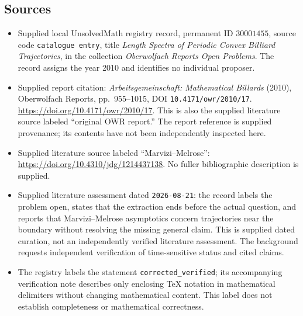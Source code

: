 \documentclass[11pt]{article}
\begin{document}
\subsection{Sources}
\begin{itemize}
\item Supplied local UnsolvedMath registry record, permanent ID \(30001455\), source code \texttt{catalogue entry}, title \emph{Length Spectra of Periodic Convex Billiard Trajectories}, in the collection \emph{Oberwolfach Reports Open Problems}. The record assigns the year 2010 and identifies no individual proposer.
\item Supplied report citation: \emph{Arbeitsgemeinschaft: Mathematical Billards} (2010), Oberwolfach Reports, pp.~955--1015, DOI \texttt{10.4171/owr/2010/17}. \url{https://doi.org/10.4171/owr/2010/17}. This is also the supplied literature source labeled ``original OWR report.'' The report reference is supplied provenance; its contents have not been independently inspected here.
\item Supplied literature source labeled ``Marvizi--Melrose'': \url{https://doi.org/10.4310/jdg/1214437138}. No fuller bibliographic description is supplied.
\item Supplied literature assessment dated \texttt{2026-08-21}: the record labels the problem open, states that the extraction ends before the actual question, and reports that Marvizi--Melrose asymptotics concern trajectories near the boundary without resolving the missing general claim. This is supplied dated curation, not an independently verified literature assessment. The background requests independent verification of time-sensitive status and cited claims.
\item The registry labels the statement \texttt{corrected\_verified}; its accompanying verification note describes only enclosing TeX notation in mathematical delimiters without changing mathematical content. This label does not establish completeness or mathematical correctness.
\end{itemize}
\end{document}
